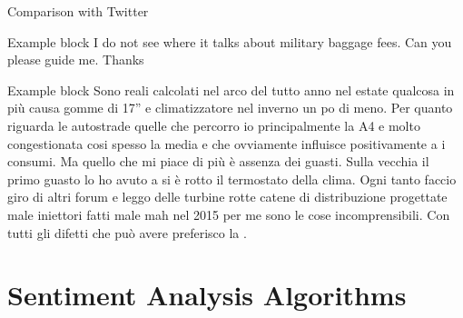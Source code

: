 \documentclass{beamer}
\begin{document}
	
	
	\begin{frame}{Comparison with Twitter}
		
		\begin{exampleblock}{Example block}
			 I do not see where it talks about military baggage fees. Can you please guide me. Thanks 
		\end{exampleblock}
		
		\begin{exampleblock}{Example block}
			{\scriptsize
				Sono reali calcolati nel arco del tutto anno nel estate qualcosa in più causa
				gomme di 17” e climatizzatore nel inverno un po di meno. Per quanto
				riguarda le autostrade quelle che percorro io principalmente la A4 e molto
				congestionata cosi spesso la media e  che ovviamente influisce
				positivamente a i consumi. Ma quello che mi piace di più è assenza dei
				guasti. Sulla vecchia  il primo guasto lo ho avuto a  si è
				rotto il termostato della clima. Ogni tanto faccio giro di altri forum e leggo
				delle turbine rotte catene di distribuzione progettate male iniettori fatti male
				mah nel 2015 per me sono le cose incomprensibili. Con tutti gli difetti che
				può avere preferisco la .}
		\end{exampleblock}
		
	\end{frame}




	\section{Sentiment Analysis Algorithms}
	
%		
%		
%	
\end{document}
